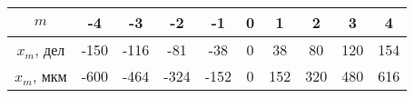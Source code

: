 \begin{tabular}{|c|c|c|c|c|c|c|c|c|c|}
\hline
$m$&-4&-3&-2&-1&0&1&2&3&4\\
\hline
$x_m$, дел&-150&-116&-81&-38&0&38&80&120&154\\
\hline
$x_m$, мкм&-600&-464&-324&-152&0&152&320&480&616\\
\hline
\end{tabular}
